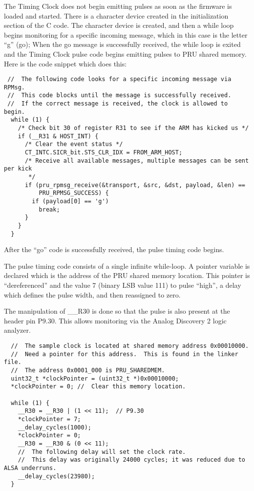 The Timing Clock does not begin emitting pulses as soon as the firmware is loaded and started.  There is a character device created in the initialization section of the C code.  The character device is created, and then a while loop begins monitoring for a specific incoming message, which in this case is the letter ``g'' (go);  When the go message is successfully received, the while loop is exited and the Timing Clock pulse code begins emitting pulses to PRU shared memory.  Here is the code snippet which does this:

\begin{verbatim}
 //  The following code looks for a specific incoming message via RPMsg.
 //  This code blocks until the message is successfully received.
 //  If the correct message is received, the clock is allowed to begin.
  while (1) {
    /* Check bit 30 of register R31 to see if the ARM has kicked us */
    if (__R31 & HOST_INT) {
      /* Clear the event status */
      CT_INTC.SICR_bit.STS_CLR_IDX = FROM_ARM_HOST;
      /* Receive all available messages, multiple messages can be sent per kick
       */
      if (pru_rpmsg_receive(&transport, &src, &dst, payload, &len) ==
          PRU_RPMSG_SUCCESS) {
        if (payload[0] == 'g')
          break;
      }
    }
  }
\end{verbatim}

After the ``go'' code is successfully received, the pulse timing code begins.

The pulse timing code consists of a single infinite while-loop.  A pointer variable is declared which is the address of the PRU shared memory location.  This pointer is ``dereferenced'' and the value 7 (binary LSB value 111) to pulse ``high'', a delay which defines the pulse width, and then reassigned to zero.

The manipulation of \_\_R30 is done so that the pulse is also present at the header pin P9.30.  This allows monitoring via the Analog Discovery 2 logic analyzer.

\begin{verbatim}
  //  The sample clock is located at shared memory address 0x00010000.
  //  Need a pointer for this address.  This is found in the linker file.
  //  The address 0x0001_000 is PRU_SHAREDMEM.
  uint32_t *clockPointer = (uint32_t *)0x00010000;
  *clockPointer = 0; //  Clear this memory location.

  while (1) {
    __R30 = __R30 | (1 << 11);  // P9.30
    *clockPointer = 7;
    __delay_cycles(1000); 
    *clockPointer = 0;
    __R30 = __R30 & (0 << 11);
    //  The following delay will set the clock rate.
    //  This delay was originally 24000 cycles; it was reduced due to ALSA underruns.
    __delay_cycles(23980); 
  }
\end{verbatim}

